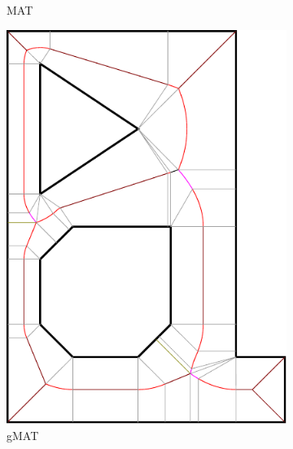 \begin{figure}
\begin{subfigure}{0.3\columnwidth}
\caption{MAT}
\end{subfigure}
\begin{subfigure}{0.3\columnwidth}
\includegraphics[width=\columnwidth]{sources/method/gMAT_example.pdf}
\caption{gMAT}
\end{subfigure}
\begin{subfigure}{0.3\columnwidth}

\end{subfigure}
\end{figure}
